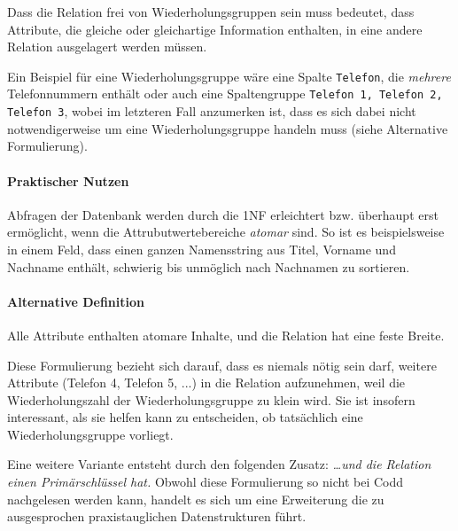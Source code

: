 \documentclass{scrbook}
\begin{document}
Dass die Relation frei von Wiederholungsgruppen sein muss bedeutet,
dass Attribute, die gleiche oder gleichartige Information
enthalten, in eine andere Relation ausgelagert werden müssen.

Ein Beispiel für eine Wiederholungsgruppe wäre eine Spalte \lstinline{Telefon},
die \emph{mehrere} Telefonnummern enthält oder auch eine Spaltengruppe 
\lstinline{Telefon 1, Telefon 2, Telefon 3}, wobei im letzteren Fall anzumerken ist,
dass es sich dabei nicht notwendigerweise um eine Wiederholungsgruppe handeln muss
(siehe Alternative Formulierung).


\paragraph{Praktischer Nutzen}

Abfragen der Datenbank werden durch die 1NF erleichtert bzw. überhaupt erst ermöglicht,
wenn die Attrubutwertebereiche \emph{atomar} sind.
So ist es beispielsweise in einem Feld,
dass einen ganzen Namensstring aus Titel, Vorname und Nachname enthält, schwierig bis 
unmöglich nach Nachnamen zu sortieren.


\paragraph{Alternative Definition}

\begin{definition}
Alle Attribute enthalten atomare Inhalte, und die Relation hat eine feste Breite.
\end{definition}

Diese Formulierung bezieht sich darauf, dass es niemals nötig sein darf,
weitere Attribute (Telefon 4, Telefon 5, ...) in die Relation aufzunehmen,
weil die Wiederholungszahl der Wiederholungsgruppe zu klein wird.
Sie ist insofern interessant, als sie helfen kann zu entscheiden,
ob tatsächlich eine Wiederholungsgruppe vorliegt.

Eine weitere Variante entsteht durch den folgenden Zusatz:
\emph{\dots und die Relation einen Primärschlüssel hat.}
Obwohl diese Formulierung so nicht bei Codd nachgelesen werden kann,
handelt es sich um eine Erweiterung die zu ausgesprochen praxistauglichen Datenstrukturen führt.
\end{document}
